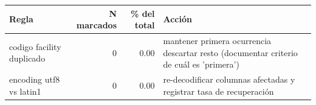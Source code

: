 \begin{tabular}{lrrp{6cm}}
\toprule
Regla & N marcados & \% del total & Acción \\
\midrule
codigo facility duplicado & 0 & 0.00 & mantener primera ocurrencia descartar resto (documentar criterio de cuál es 'primera') \\
encoding utf8 vs latin1 & 0 & 0.00 & re-decodificar columnas afectadas y registrar tasa de recuperación \\
\bottomrule
\end{tabular}

